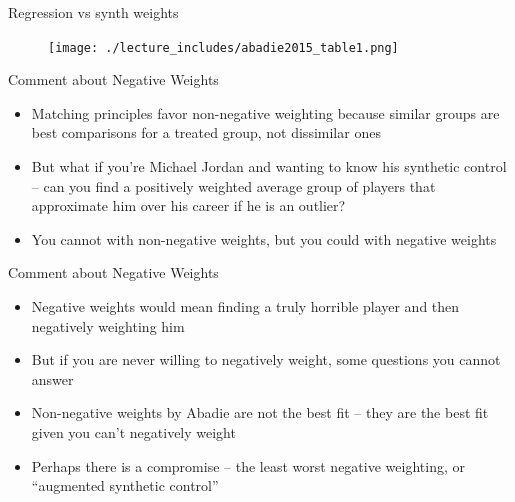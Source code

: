\documentclass{beamer}
\begin{document}
\begin{frame}{Regression vs synth weights}
	\begin{figure}
	\texttt{[image: ./lecture\_includes/abadie2015\_table1.png]}
	\end{figure}
\end{frame}



\begin{frame}{Comment about Negative Weights}

\begin{itemize}

\item Matching principles favor non-negative weighting because similar groups are best comparisons for a treated group, not dissimilar ones
\item But what if you're Michael Jordan and wanting to know his synthetic control -- can you find a positively weighted average group of players that approximate him over his career if he is an outlier?
\item You cannot with non-negative weights, but you could with negative weights

\end{itemize}

\end{frame}

\begin{frame}{Comment about Negative Weights}

\begin{itemize}

\item Negative weights would mean finding a truly horrible player and then negatively weighting him 
\item But if you are never willing to negatively weight, some questions you cannot answer
\item Non-negative weights by Abadie are not the best fit -- they are the best fit given you can't negatively weight
\item Perhaps there is a compromise -- the least worst negative weighting, or ``augmented synthetic control''

\end{itemize}

\end{frame}
\end{document}
